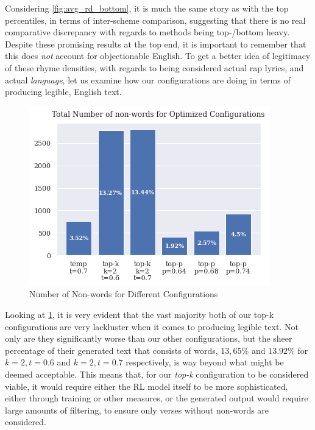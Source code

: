 Considering \cref{fig:avg_rd_bottom}, it is much the same story as with the top percentiles, in terms of inter-scheme comparison, suggesting that there is no real comparative discrepancy with regards to methods being top-/bottom heavy. Despite these promising results at the top end, it is important to remember that this does \textit{not} account for objectionable English. To get a better idea of legitimacy of these rhyme densities, with regards to being considered actual rap lyrics, and actual \textit{language}, let us examine how our configurations are doing in terms of producing legible, English text.

\begin{figure}[H]
    \centering
    \includegraphics[scale=0.5, keepaspectratio=true]{figures/non-words.png}
    \caption{Number of Non-words for Different Configurations}
    \label{fig:non-words}
\end{figure}

Looking at \cref{fig:non-words}, it is very evident that the vast majority both of our top-k configurations are very lackluster when it comes to producing legible text. Not only are they significantly worse than our other configurations, but the sheer percentage of their generated text that consists of words, $13,65\%$ and $13.92\%$ for $k=2, t=0.6$ and $k=2, t=0.7$ respectively, is way beyond what might be deemed acceptable. This means that, for our \textit{top-k} configuration to be considered viable, it would require either the RL model itself to be more sophisticated, either through training or other measures, or the generated output would require large amounts of filtering, to ensure only verses without non-words are considered.

